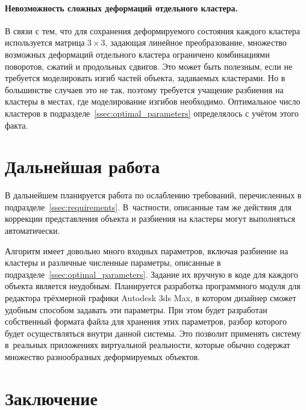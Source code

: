 \documentclass[a4paper, 14pt, titlepage]{extarticle}
\let\oldsection\section
\renewcommand{\section}{\newpage\oldsection}
\begin{document}
        \paragraph{Невозможность сложных деформаций отдельного кластера.} В связи с тем, что для сохранения
        деформируемого состояния каждого кластера используется матрица $3 \times 3$, задающая
        линейное преобразование, множество возможных деформаций отдельного кластера ограничено комбинациями
        поворотов, сжатий и продольных сдвигов. Это может быть полезным, если не требуется
        моделировать изгиб частей объекта, задаваемых кластерами. Но в большинстве случаев это не
        так, поэтому требуется учащение разбиения на кластеры в местах, где моделирование
        изгибов необходимо. Оптимальное число кластеров в подразделе~\ref{ssec:optimal_parameters}
        определялось с учётом этого факта.

  \section{Дальнейшая работа}

    В дальнейшем планируется работа по ослаблению требований, перечисленных
    в подразделе~\ref{ssec:requirements}. В~частности, описанные там же действия для коррекции
    представления объекта и разбиения на кластеры могут выполняться автоматически.

    Алгоритм имеет довольно много входных параметров, включая разбиение на кластеры и
    различные численные параметры, описанные в подразделе~\ref{ssec:optimal_parameters}. Задание их вручную в коде для каждого
    объекта является неудобным. Планируется разработка программного модуля для редактора
    трёхмерной графики Autodesk 3ds Max, в котором дизайнер сможет удобным способом задавать эти параметры. При этом
    будет разработан собственный формата файла для хранения этих параметров, разбор которого будет
    осуществляться внутри данной системы. Это позволит применять систему в~реальных приложениях
    виртуальной реальности, которые обычно содержат множество разнообразных деформируемых объектов.

  \section{Заключение}\label{sec:conclusion}
\end{document}
